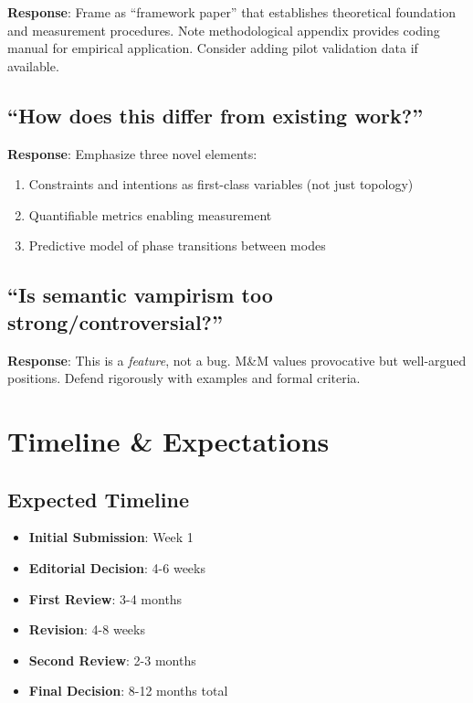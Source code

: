 \documentclass[12pt]{article}
\begin{document}
\textbf{Response}: Frame as ``framework paper'' that establishes theoretical foundation and measurement procedures. Note methodological appendix provides coding manual for empirical application. Consider adding pilot validation data if available.

\subsection{``How does this differ from existing work?''}

\textbf{Response}: Emphasize three novel elements:
\begin{enumerate}
\item Constraints and intentions as first-class variables (not just topology)
\item Quantifiable metrics enabling measurement
\item Predictive model of phase transitions between modes
\end{enumerate}

\subsection{``Is semantic vampirism too strong/controversial?''}

\textbf{Response}: This is a \textit{feature}, not a bug. M\&M values provocative but well-argued positions. Defend rigorously with examples and formal criteria.

\section{Timeline \& Expectations}

\subsection{Expected Timeline}

\begin{itemize}[leftmargin=*]
\item \textbf{Initial Submission}: Week 1
\item \textbf{Editorial Decision}: 4-6 weeks
\item \textbf{First Review}: 3-4 months
\item \textbf{Revision}: 4-8 weeks
\item \textbf{Second Review}: 2-3 months
\item \textbf{Final Decision}: 8-12 months total
\end{itemize}
\end{document}
